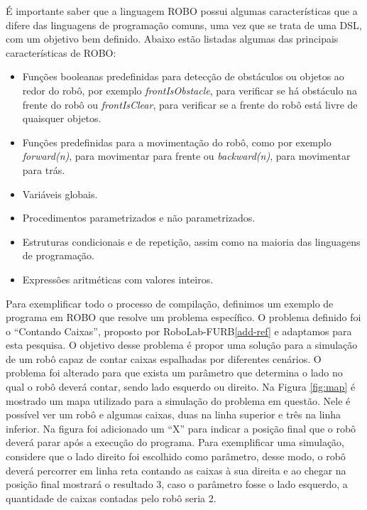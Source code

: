 É importante saber que a linguagem ROBO possui algumas características que a difere das linguagens de programação comuns, uma vez que se trata de uma DSL, com um objetivo bem definido. Abaixo estão listadas algumas das principais características de ROBO:

\begin{itemize}
    \item Funções booleanas predefinidas para detecção de obstáculos ou objetos ao redor do robô, por exemplo \textit{frontIsObstacle}, para verificar se há obstáculo na frente do robô ou \textit{frontIsClear}, para verificar se a frente do robô está livre de quaisquer objetos.
    \item Funções predefinidas para a movimentação do robô, como por exemplo \textit{forward(n)}, para movimentar para frente ou \textit{backward(n)}, para movimentar para trás.
    \item Variáveis globais.
    \item Procedimentos parametrizados e não parametrizados.
    \item Estruturas condicionais e de repetição, assim como na maioria das linguagens de programação.
    \item Expressões aritméticas com valores inteiros.
\end{itemize}

Para exemplificar todo o processo de compilação, definimos um exemplo de programa em ROBO que resolve um problema específico. O problema definido foi o ``Contando Caixas'', proposto por RoboLab-FURB\ref{add-ref} e adaptamos para esta pesquisa. O objetivo desse problema é propor uma solução para a simulação de um robô capaz de contar caixas espalhadas por diferentes cenários. O problema foi alterado para que exista um parâmetro que determina o lado no qual o robô deverá contar, sendo lado esquerdo ou direito. Na Figura \ref{fig:map} é mostrado um mapa utilizado para a simulação do problema em questão. Nele é possível ver um robô e algumas caixas, duas na linha superior e três na linha inferior. Na figura foi adicionado um ``X'' para indicar a posição final que o robô deverá parar após a execução do programa. Para exemplificar uma simulação, considere que o lado direito foi escolhido como parâmetro, desse modo, o robô deverá percorrer em linha reta contando as caixas à sua direita e ao chegar na posição final mostrará o resultado 3, caso o parâmetro fosse o lado esquerdo, a quantidade de caixas contadas pelo robô seria 2.

